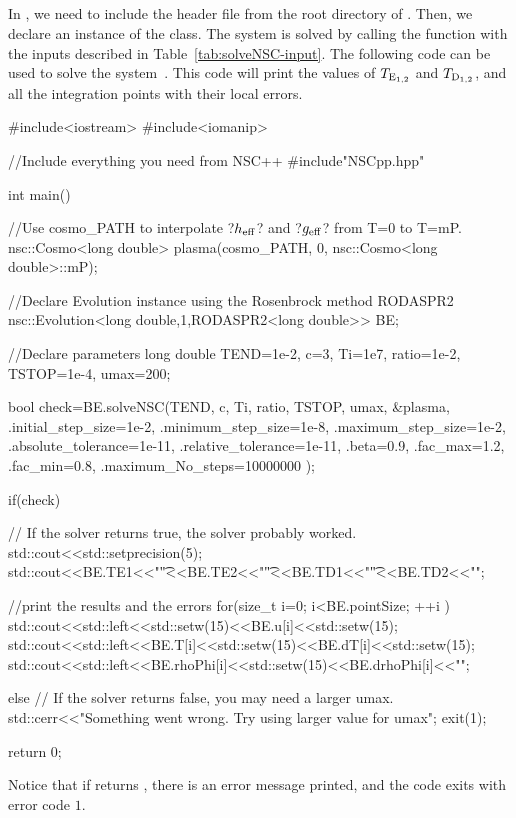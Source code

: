\documentclass[11pt,a4paper]{article}
\begin{document}
\subsection{\CPP}
%
In \CPP, we need to include the header file  from the root directory of \nsc. Then, we declare an instance of the  class. The system is solved by calling the  function with the inputs described in Table~\ref{tab:solveNSC-input}. The following code can be used to solve the system~. This code will print the values of $T_{\rm E_{1,2}}$ and $T_{\rm D_{1,2}}$, and all the integration points with their local errors.
%
\begin{cpp}
#include<iostream>
#include<iomanip>

//Include everything you need from NSC++
#include"NSCpp.hpp"

int main(){
	//Use cosmo_PATH to interpolate ?$h_{\rm eff}{}$? and ?$g_{\rm eff}{}$? from T=0 to T=mP.
	nsc::Cosmo<long double> plasma(cosmo_PATH, 0, nsc::Cosmo<long double>::mP);
	
	//Declare Evolution instance using the Rosenbrock method RODASPR2
	nsc::Evolution<long double,1,RODASPR2<long double>> BE;
	
	//Declare parameters
	long double TEND=1e-2, c=3, Ti=1e7, ratio=1e-2, TSTOP=1e-4, umax=200;
	
	bool check=BE.solveNSC(TEND, c, Ti, ratio, TSTOP, umax, &plasma,
				{
					.initial_step_size=1e-2, .minimum_step_size=1e-8, .maximum_step_size=1e-2, 
					.absolute_tolerance=1e-11, .relative_tolerance=1e-11, .beta=0.9, 
					.fac_max=1.2, .fac_min=0.8, .maximum_No_steps=10000000
				});
	
	if(check){
		// If the solver returns true, the solver probably worked.
		std::cout<<std::setprecision(5);
		std::cout<<BE.TE1<<"\t"<<BE.TE2<<"\t"<<BE.TD1<<"\t"<<BE.TD2<<"\n";
		
		//print the results and the errors
		for(size_t i=0; i<BE.pointSize; ++i ){
			std::cout<<std::left<<std::setw(15)<<BE.u[i]<<std::setw(15);
			std::cout<<std::left<<BE.T[i]<<std::setw(15)<<BE.dT[i]<<std::setw(15);
			std::cout<<std::left<<BE.rhoPhi[i]<<std::setw(15)<<BE.drhoPhi[i]<<"\n";
		}
	}else{
		// If the solver returns false, you may need a larger umax.
		std::cerr<<"Something went wrong. Try using larger value for umax\n";
		exit(1);
	}
	
	return 0;
}
\end{cpp}
%
Notice that if  returns , there is an error message printed, and the code exits  with error code $1$.
\end{document}
